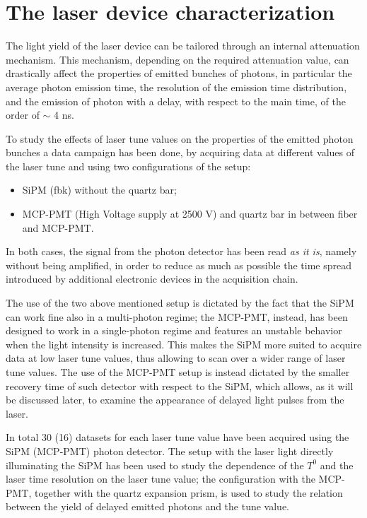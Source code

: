 \documentclass[a4paper,11pt]{article}
\begin{document}
\section{The laser device characterization}\label{sec:laser_tune_study} 

The light yield of the laser device can be tailored through an internal attenuation mechanism. This mechanism, depending on the required attenuation value, can drastically affect the properties of emitted bunches of photons, in particular the average photon emission time, the resolution of the emission time distribution, and the emission of photon with a delay, with respect to the main time, of the order of $\sim$ 4 ns.

To study the effects of laser tune values on the properties of the emitted photon bunches a data campaign has been done, by acquiring data at different values of the laser tune and using two configurations of the setup:
	\begin{itemize}
		\item SiPM (fbk) without the quartz bar; 
		\item MCP-PMT (High Voltage supply at 2500 V) and quartz bar in between fiber and MCP-PMT.
	\end{itemize}
In both cases, the signal from the photon detector has been read {\it as it is}, namely without being amplified, in order to reduce as much as possible the time spread introduced by additional electronic devices in the acquisition chain. 

The use of the two above mentioned setup is dictated by the fact that the SiPM can work fine also in a multi-photon regime; the MCP-PMT, instead, has been designed to work in a single-photon regime and features an unstable behavior when the light intensity is increased. This makes the SiPM more suited to acquire data at low laser tune values, thus allowing to scan over a wider range of laser tune values. The use of the MCP-PMT setup is instead dictated by the smaller recovery time of such detector with respect to the SiPM, which allows, as it will be discussed later, to examine the appearance of delayed light pulses from the laser.%


In total 30 (16) datasets for each laser tune value have been acquired using the SiPM (MCP-PMT) photon detector.
The setup with the laser light directly illuminating the SiPM has been used to study the dependence of the $T^0$ and the laser time resolution on the laser tune value; the configuration with the MCP-PMT, together with the quartz expansion prism, is used to study the relation between the yield of delayed emitted photons and the tune value. 
	
\end{document}
